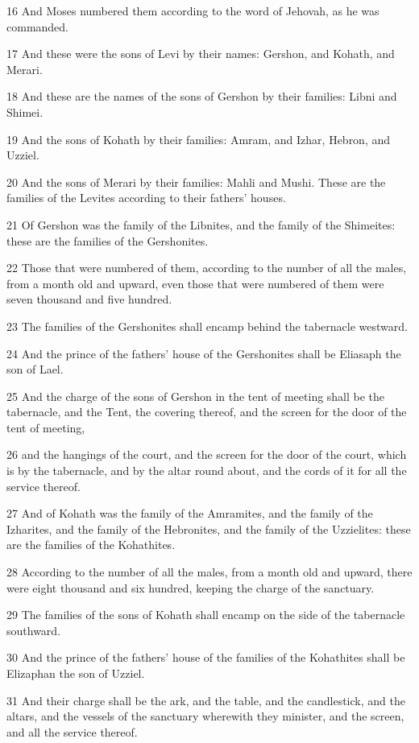 \par 16 And Moses numbered them according to the word of Jehovah, as he was commanded.
\par 17 And these were the sons of Levi by their names: Gershon, and Kohath, and Merari.
\par 18 And these are the names of the sons of Gershon by their families: Libni and Shimei.
\par 19 And the sons of Kohath by their families: Amram, and Izhar, Hebron, and Uzziel.
\par 20 And the sons of Merari by their families: Mahli and Mushi. These are the families of the Levites according to their fathers' houses.
\par 21 Of Gershon was the family of the Libnites, and the family of the Shimeites: these are the families of the Gershonites.
\par 22 Those that were numbered of them, according to the number of all the males, from a month old and upward, even those that were numbered of them were seven thousand and five hundred.
\par 23 The families of the Gershonites shall encamp behind the tabernacle westward.
\par 24 And the prince of the fathers' house of the Gershonites shall be Eliasaph the son of Lael.
\par 25 And the charge of the sons of Gershon in the tent of meeting shall be the tabernacle, and the Tent, the covering thereof, and the screen for the door of the tent of meeting,
\par 26 and the hangings of the court, and the screen for the door of the court, which is by the tabernacle, and by the altar round about, and the cords of it for all the service thereof.
\par 27 And of Kohath was the family of the Amramites, and the family of the Izharites, and the family of the Hebronites, and the family of the Uzzielites: these are the families of the Kohathites.
\par 28 According to the number of all the males, from a month old and upward, there were eight thousand and six hundred, keeping the charge of the sanctuary.
\par 29 The families of the sons of Kohath shall encamp on the side of the tabernacle southward.
\par 30 And the prince of the fathers' house of the families of the Kohathites shall be Elizaphan the son of Uzziel.
\par 31 And their charge shall be the ark, and the table, and the candlestick, and the altars, and the vessels of the sanctuary wherewith they minister, and the screen, and all the service thereof.
